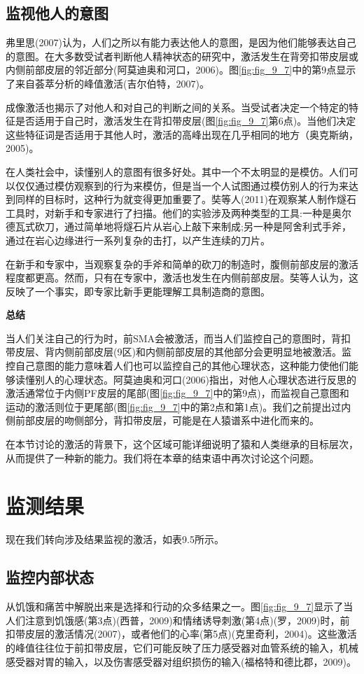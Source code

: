 \subsection{监视他人的意图}
\par
弗里思(2007)认为，人们之所以有能力表达他人的意图，是因为他们能够表达自己的意图。在大多数受试者判断他人精神状态的研究中，激活发生在背旁扣带皮层或内侧前部皮层的邻近部分(阿莫迪奥和河口，2006)。图\ref{fig:fig_9_7}中的第9点显示了来自荟萃分析的峰值激活(吉尔伯特，2007)。
\par
成像激活也揭示了对他人和对自己的判断之间的关系。当受试者决定一个特定的特征是否适用于自己时，激活发生在背扣带皮层(图\ref{fig:fig_9_7}第6点)。当他们决定这些特征词是否适用于其他人时，激活的高峰出现在几乎相同的地方（奥克斯纳，2005)。
\par
在人类社会中，读懂别人的意图有很多好处。其中一个不太明显的是模仿。人们可以仅仅通过模仿观察到的行为来模仿，但是当一个人试图通过模仿别人的行为来达到同样的目标时，这种行为就变得更加重要了。奘等人(2011)在观察某人制作燧石工具时，对新手和专家进行了扫描。他们的实验涉及两种类型的工具:一种是奥尔德瓦式砍刀，通过简单地将燧石片从岩心上敲下来制成;另一种是阿舍利式手斧，通过在岩心边缘进行一系列复杂的击打，以产生连续的刀片。
\par
在新手和专家中，当观察复杂的手斧和简单的砍刀的制造时，腹侧前部皮层的激活程度都更高。然而，只有在专家中，激活也发生在内侧前部皮层。奘等人认为，这反映了一个事实，即专家比新手更能理解工具制造商的意图。
\par
\textbf{总结}
\par
当人们关注自己的行为时，前SMA会被激活，而当人们监控自己的意图时，背扣带皮层、背内侧前部皮层(9区)和内侧前部皮层的其他部分会更明显地被激活。监控自己意图的能力意味着人们也可以监控自己的其他心理状态，这种能力使他们能够读懂别人的心理状态。阿莫迪奥和河口(2006)指出，对他人心理状态进行反思的激活通常位于内侧PF皮层的尾部(图\ref{fig:fig_9_7}中的第9点)，而监视自己意图和运动的激活则位于更尾部(图\ref{fig:fig_9_7}中的第2点和第1点)。我们之前提出过内侧前部皮层的吻侧部分，背扣带皮层，可能是在人猿谱系中进化而来的。
\par
在本节讨论的激活的背景下，这个区域可能详细说明了猿和人类继承的目标层次，从而提供了一种新的能力。我们将在本章的结束语中再次讨论这个问题。
\section{监测结果}
\par
现在我们转向涉及结果监视的激活，如表9.5所示。
\subsection{监控内部状态}
\par
从饥饿和痛苦中解脱出来是选择和行动的众多结果之一。图\ref{fig:fig_9_7}显示了当人们注意到饥饿感(第3点)(西普，2009)和情绪诱导刺激(第4点)(罗，2009)时，前扣带皮层的激活情况(2007)，或者他们的心率(第5点)(克里奇利，2004)。这些激活的峰值往往位于前扣带皮层，它们可能反映了压力感受器对血管系统的输入，机械感受器对胃的输入，以及伤害感受器对组织损伤的输入(福格特和德比郡，2009)。
\par

